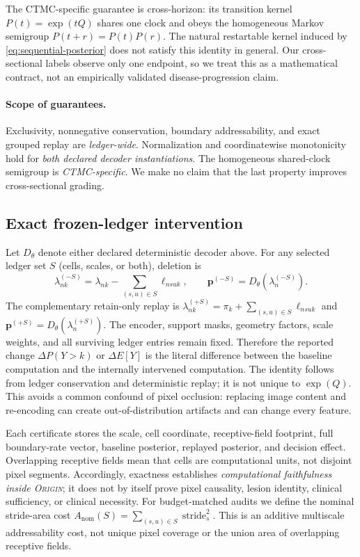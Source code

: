 \documentclass[10pt,twocolumn,letterpaper]{article}
\newcommand{\method}{\textsc{Origin}\xspace}
\begin{document}
The CTMC-specific guarantee is cross-horizon: its transition kernel
$P(t)=\exp(tQ)$ shares one clock and obeys the homogeneous Markov semigroup
$P(t+r)=P(t)P(r)$.  The natural restartable kernel induced by
\cref{eq:sequential-posterior} does not satisfy this identity in general.  Our
cross-sectional labels observe only one endpoint, so we treat this as a
mathematical contract, not an empirically validated disease-progression claim.

\paragraph{Scope of guarantees.}
Exclusivity, nonnegative conservation, boundary addressability, and exact
grouped replay are \emph{ledger-wide}.  Normalization and coordinatewise
monotonicity hold for \emph{both declared decoder instantiations}.  The
homogeneous shared-clock semigroup is \emph{CTMC-specific}.  We make no claim
that the last property improves cross-sectional grading.

\subsection{Exact frozen-ledger intervention}
\label{sec:intervention}

Let $D_\theta$ denote either declared deterministic decoder above.  For any
selected ledger set $S$ (cells, scales, or both), deletion is
\begin{equation}
\lambda^{(-S)}_{nk}=\lambda_{nk}-
\sum_{(s,u)\in S}\ell_{nsuk},
\qquad
\mathbf p^{(-S)}=D_\theta(\lambda^{(-S)}_n).
\label{eq:intervention}
\end{equation}
The complementary retain-only replay is
$\lambda^{(+S)}_{nk}=\pi_k+\sum_{(s,u)\in S}\ell_{nsuk}$ and
$\mathbf p^{(+S)}=D_\theta(\lambda^{(+S)}_n)$.
The encoder, support masks, geometry factors, scale weights, and all surviving
ledger entries remain fixed.  Therefore the reported change
$\Delta P(Y>k)$ or $\Delta E[Y]$ is the literal difference between the baseline
computation and the internally intervened computation.  The identity follows
from ledger conservation and deterministic replay; it is not unique to
$\exp(Q)$.  This avoids a common confound of pixel occlusion: replacing image
content and re-encoding can create out-of-distribution artifacts and can change
every feature.

Each certificate stores the scale, cell coordinate, receptive-field footprint,
full boundary-rate vector, baseline posterior, replayed posterior, and decision
effect.  Overlapping receptive fields mean that cells are computational units,
not disjoint pixel segments.  Accordingly, exactness establishes
\emph{computational faithfulness inside \method}; it does not by itself prove
pixel causality, lesion identity, clinical sufficiency, or clinical necessity.
For budget-matched audits we define the nominal stride-area cost
$A_{\mathrm{nom}}(S)=\sum_{(s,u)\in S}\operatorname{stride}_s^2$.  This is an
additive multiscale addressability cost, not unique pixel coverage or the union
area of overlapping receptive fields.
\end{document}
